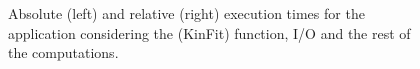 \begin{figure}[!htp]
	\begin{center}
		\caption{Absolute (left) and relative (right) execution times for the \tth application considering the \ttDilepKinFit (KinFit) function, I/O and the rest of the computations.}
		\label{fig:KinFitGraph}
	\end{center}
\end{figure}

